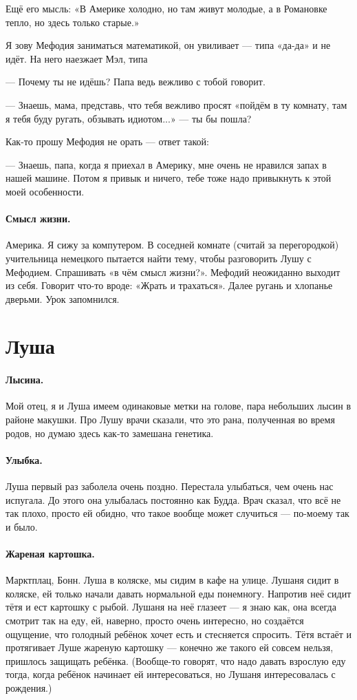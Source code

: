 \documentclass{book}
\begin{document}
Ещё его мысль: «В Америке холодно, но там живут молодые, а в Романовке тепло, но здесь только старые.» 

Я зову Мефодия заниматься математикой, он увиливает --- типа «да-да» и не идёт.
На него наезжает Мэл, типа 

--- Почему ты не идёшь? Папа ведь вежливо с тобой говорит.

--- Знаешь, мама, представь, что тебя вежливо просят «пойдём в ту комнату, там я тебя буду ругать, обзывать идиотом...» --- ты бы пошла?

Как-то прошу Мефодия не орать --- ответ такой:

--- Знаешь, папа, когда я приехал в Америку, мне очень не нравился запах в нашей машине.
Потом я привык и ничего, тебе тоже надо привыкнуть к этой моей особенности.

\paragraph{Смысл жизни.}
Америка.
Я сижу за компутером.
В соседней комнате (считай за перегородкой) учительница немецкого пытается найти тему, чтобы разговорить Лушу с Мефодием.
Спрашивать «в чём смысл жизни?».
Мефодий неожиданно выходит из себя.
Говорит что-то вроде: «Жрать и трахаться».
Далее ругань и хлопанье дверьми.
Урок запомнился.

\section*{Луша}

\paragraph{Лысина.} Мой отец, я и Луша имеем одинаковые метки на голове, пара небольших лысин в районе макушки.
Про Лушу врачи сказали, что это рана, полученная во время родов, но думаю здесь как-то замешана генетика.

\paragraph{Улыбка.} Луша первый раз заболела очень поздно.
Перестала улыбаться, чем очень нас испугала.
До этого она улыбалась постоянно как Будда.
Врач сказал, что всё не так плохо, просто ей обидно, что такое вообще может случиться --- по-моему так и было.

\paragraph{Жареная картошка.} Марктплац, Бонн.
Луша в коляске, мы сидим в кафе на улице.
Лушаня сидит в коляске, ей только начали давать нормальной еды понемногу.
Напротив неё сидит тётя и ест картошку с рыбой.
Лушаня на неё глазеет --- я знаю как, она всегда смотрит так на еду, ей, наверно, просто очень интересно, но создаётся ощущение, что голодный ребёнок хочет есть и стесняется спросить.
Тётя встаёт и протягивает Луше жареную картошку --- конечно же такого ей совсем нельзя, пришлось защищать ребёнка.
(Вообще-то говорят, что надо давать взрослую еду тогда, когда ребёнок начинает ей интересоваться, но Лушаня интересовалась с рождения.)
\end{document}
